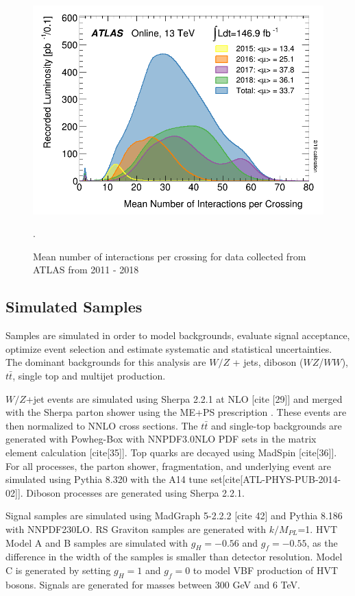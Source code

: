 \begin{figure}[h!]
  \centering
  \includegraphics[width=\hsize]{figures/Analysis/mu_profile.png}
  \caption{Mean number of interactions per crossing for data collected from ATLAS from 2011 - 2018}. 
  \label{fig:mu_profile}
\end{figure} 
\FloatBarrier


\subsection{Simulated Samples}
Samples are simulated in order to model backgrounds, evaluate signal acceptance, optimize event selection and estimate systematic and statistical uncertainties. The dominant backgrounds for this analysis are $W/Z$ + jets, diboson ($WZ$/$WW$), $t\bar{t}$, single top and multijet production. 

$W/Z$+jet events are simulated using Sherpa 2.2.1 at NLO [cite [29]] and merged with the Sherpa parton shower using the ME+PS prescription \cite{me_ps}. These events are then normalized to NNLO cross sections. The $t\bar{t}$ and single-top backgrounds are generated with Powheg-Box with NNPDF3.0NLO PDF sets in the matrix element calculation [cite[35]]. Top quarks are decayed using MadSpin [cite[36]]. For all processes, the parton shower, fragmentation, and underlying event are simulated using Pythia 8.320 with the A14 tune set[cite[ATL-PHYS-PUB-2014-02]]. Diboson processes are generated using Sherpa 2.2.1. 

Signal samples are simulated using MadGraph 5-2.2.2 [cite 42] and Pythia 8.186 with NNPDF230LO. RS Graviton samples are generated with $k/M_{PL}$=1. HVT Model A and B samples are simulated with $g_{H}=-0.56$ and $g_{f}=-0.55$, as the difference in the width of the samples is smaller than detector resolution. Model C is generated by setting $g_{H}=1$ and $g_{f}=0$ to model VBF production of HVT bosons. Signals are generated for masses between 300 GeV and 6 TeV.

